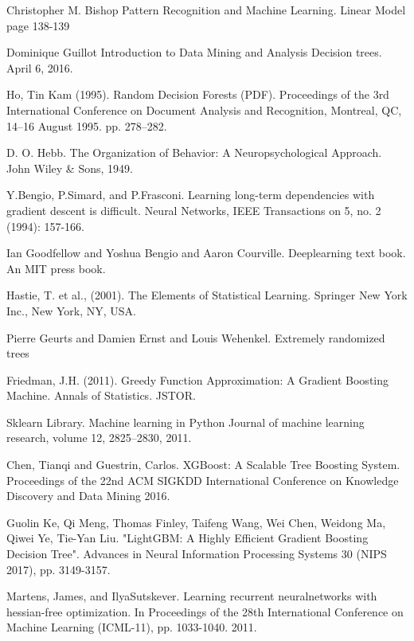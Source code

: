 \documentclass[12pt,a4paper]{report}
\begin{document}
\begin{thebibliography}{1}
Christopher M. Bishop
\newblock Pattern Recognition and Machine Learning.
\newblock Linear Model page 138-139
 
Dominique Guillot
\newblock Introduction to Data Mining and Analysis
Decision trees.
\newblock April 6, 2016.

Ho, Tin Kam (1995).
\newblock Random Decision Forests (PDF).
\newblock Proceedings of the 3rd International Conference on Document Analysis and Recognition, Montreal, QC, 14–16 August 1995. pp. 278–282.

D. O. Hebb.
\newblock The Organization of Behavior: A Neuropsychological Approach.
\newblock John Wiley \& Sons, 1949.
 
Y.Bengio, P.Simard, and P.Frasconi.
\newblock Learning long-term dependencies with gradient descent is difficult.
\newblock Neural Networks, IEEE Transactions on 5, no. 2 (1994): 157-166.


Ian Goodfellow and Yoshua Bengio and Aaron Courville.
\newblock Deeplearning text book.
\newblock An MIT press book.

Hastie, T. et al., (2001).
\newblock The Elements of Statistical Learning. Springer New York Inc., New York, NY, USA.

Pierre Geurts and Damien Ernst and Louis Wehenkel.
\newblock Extremely randomized trees

Friedman, J.H. (2011). 
\newblock Greedy Function Approximation: A Gradient Boosting Machine. Annals of Statistics. JSTOR.

Sklearn Library.
\newblock Machine learning in Python
\newblock Journal of machine learning research, volume 12, 2825--2830, 2011.

Chen, Tianqi and Guestrin, Carlos.
\newblock XGBoost: A Scalable Tree Boosting System.
\newblock Proceedings of the 22nd ACM SIGKDD International Conference on Knowledge Discovery and Data Mining 2016.

Guolin Ke, Qi Meng, Thomas Finley, Taifeng Wang, Wei Chen, Weidong Ma, Qiwei Ye, Tie-Yan Liu. \newblock "LightGBM: A Highly Efficient Gradient Boosting Decision Tree". 
\newblock Advances in Neural Information Processing Systems 30 (NIPS 2017), pp. 3149-3157.

Martens, James, and IlyaSutskever.
\newblock Learning recurrent neuralnetworks with hessian-free optimization.
\newblock In Proceedings of the 28th International Conference on Machine Learning (ICML-11), pp. 1033-1040. 2011.


\end{thebibliography}
\end{document}

